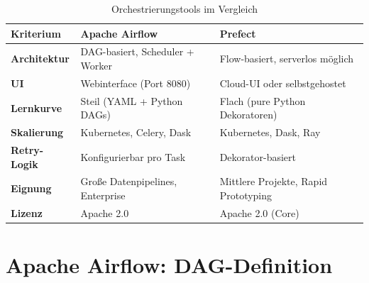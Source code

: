 \documentclass[12pt,a4paper]{report}
\theoremstyle{definition}
\theoremstyle{remark}
\begin{document}
\begin{table}[H]
\centering
\caption{Orchestrierungstools im Vergleich}
\label{tab:orch}
\renewcommand{\arraystretch}{1.3}
\begin{tabularx}{\linewidth}{>{\bfseries\footnotesize}l >{\footnotesize}X >{\footnotesize}X}
\toprule
Kriterium          & Apache Airflow                     & Prefect \\
\midrule
Architektur        & DAG-basiert, Scheduler + Worker    & Flow-basiert, serverlos m\"oglich \\
UI                 & Webinterface (Port 8080)           & Cloud-UI oder selbstgehostet \\
Lernkurve          & Steil (YAML + Python DAGs)         & Flach (pure Python Dekoratoren) \\
Skalierung         & Kubernetes, Celery, Dask           & Kubernetes, Dask, Ray \\
Retry-Logik        & Konfigurierbar pro Task            & Dekorator-basiert \\
Eignung            & Gro\ss{}e Datenpipelines, Enterprise & Mittlere Projekte, Rapid Prototyping \\
Lizenz             & Apache 2.0                         & Apache 2.0 (Core) \\
\bottomrule
\end{tabularx}
\end{table}

\section{Apache Airflow: DAG-Definition}
\end{document}
